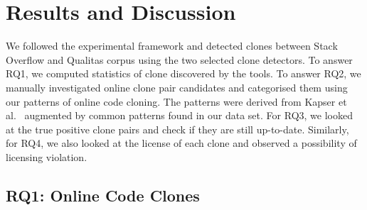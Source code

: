 \documentclass{sig-alternate-05-2015}
\newcommand\FIXME[1]{\textbf{FIXME: #1}}
\begin{document}
\section{Results and Discussion}

We followed the experimental framework and detected clones between Stack Overflow and Qualitas corpus using the two selected clone detectors. To answer RQ1, we computed statistics of clone discovered by the tools. To answer RQ2, we manually investigated online clone pair candidates and categorised them using our patterns of online code cloning. The patterns were derived from Kapser et al.~\cite{Kapser2003} augmented by common patterns found in our data set. For RQ3, we looked at the true positive clone pairs and check if they are still up-to-date. Similarly, for RQ4, we also looked at the license of each clone and observed a possibility of licensing violation.

\subsection{RQ1: Online Code Clones} 

\begin{table}
	\centering
	\caption{Statistics of clones found between Stack Overflow and Qualitas projects using Simian (\textit{S}) and NiCad (\textit{N}) with default (\textit{D}) and EvaClone (\textit{E}) configurations \FIXME{boxplots here?}}
	\label{tab:raw_stats}
	\small
\end{table}
\end{document}
